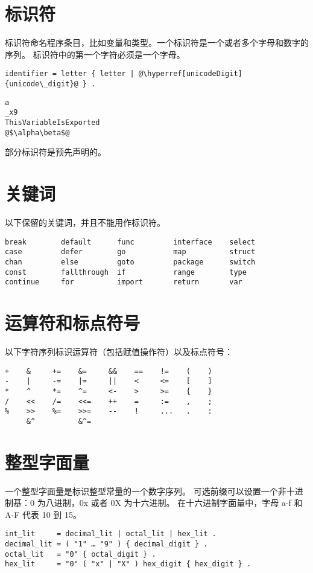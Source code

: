 \section{标识符}
标识符命名程序条目，比如变量和类型。一个标识符是一个或者多个字母和数字的序列。
标识符中的第一个字符必须是一个字母。
\begin{lstlisting}[style=EBNF]
identifier = letter { letter | @\hyperref[unicodeDigit]{unicode\_digit}@ } .
\end{lstlisting}

\begin{lstlisting}[style=golang]
a
_x9
ThisVariableIsExported
@$\alpha\beta$@
\end{lstlisting}
部分标识符是预先声明的。

\section{关键词}
以下保留的关键词，并且不能用作标识符。
\begin{lstlisting}[style=golang]
break        default      func         interface    select
case         defer        go           map          struct
chan         else         goto         package      switch
const        fallthrough  if           range        type
continue     for          import       return       var
\end{lstlisting}

\section{运算符和标点符号}
以下字符序列标识运算符（包括赋值操作符）以及标点符号：
\begin{lstlisting}[style=golang]
+    &     +=    &=     &&    ==    !=    (    )
-    |     -=    |=     ||    <     <=    [    ]
*    ^     *=    ^=     <-    >     >=    {    }
/    <<    /=    <<=    ++    =     :=    ,    ;
%    >>    %=    >>=    --    !     ...   .    :
     &^          &^=
\end{lstlisting}

\section{整型字面量}
一个整型字面量是标识整型常量的一个数字序列。
可选前缀可以设置一个非十进制基：0 为八进制，0x 或者 0X 为十六进制。
在十六进制字面量中，字母 a-f 和 A-F 代表 10 到 15。
\begin{lstlisting}[style=EBNF]
int_lit     = decimal_lit | octal_lit | hex_lit .
decimal_lit = ( "1" … "9" ) { decimal_digit } .
octal_lit   = "0" { octal_digit } .
hex_lit     = "0" ( "x" | "X" ) hex_digit { hex_digit } .
\end{lstlisting}

